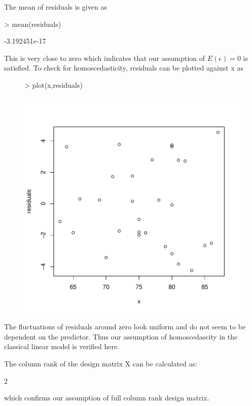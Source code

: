 \documentclass[12pt]{article}
\begin{document}
The mean of residuals is given as
\begin{Schunk}
\begin{Sinput}
> mean(residuals)
\end{Sinput}
\begin{Soutput}
[1] -3.192451e-17
\end{Soutput}
\end{Schunk}
This is very close to zero which indicates that our assumption of $E(\epsilon)=0$ is satisfied.
To check for homoscedasticity, residuals can be plotted against x as
\begin{figure}[H]
\begin{Schunk}
\begin{Sinput}
> plot(x,residuals)
\end{Sinput}
\end{Schunk}
\includegraphics{HW3-025}
\end{figure}
The fluctuations of residuals around zero look uniform and do not seem to be dependent on the predictor. Thus our assumption of homoscedascity in the classical linear model is verified here.

The column rank of the design matrix X can be calculated as:
\begin{Schunk}
\begin{Soutput}
[1] 2
\end{Soutput}
\end{Schunk}
which confirms our assumption of full column rank design matrix.
\end{document}
